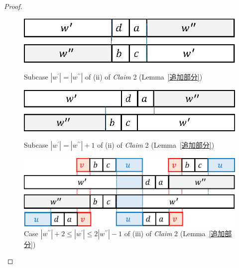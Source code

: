 \begin{proof}
\begin{figure}[t]
  \begin{center}
    \includegraphics[scale=0.45]{figs/w=w_1.eps}
    \caption{Subcase $|w^{\prime}| = |w^{\prime\prime}|$ of (ii) of \textit{Claim} 2 (Lemma~\ref{追加部分})}\label{追加部分7}
    \bigskip
    \includegraphics[scale=0.45]{figs/w=w_1+1.eps}
    \caption{Subcase $|w^{\prime}| = |w^{\prime\prime}| + 1$ of (ii) of \textit{Claim} 2 (Lemma~\ref{追加部分})}\label{追加部分8}
  \end{center}
\end{figure}

\begin{figure}[t]
  \begin{center}
    \includegraphics[scale=0.45]{figs/w=w_1+2.eps}
    \caption{Case $|w^{\prime\prime}| + 2 \le |w^{\prime}| \le 2|w^{\prime\prime}| - 1$ of (iii) of \textit{Claim} 2 (Lemma~\ref{追加部分})}\label{w1+3}
  \end{center}
\end{figure}


\end{proof}
